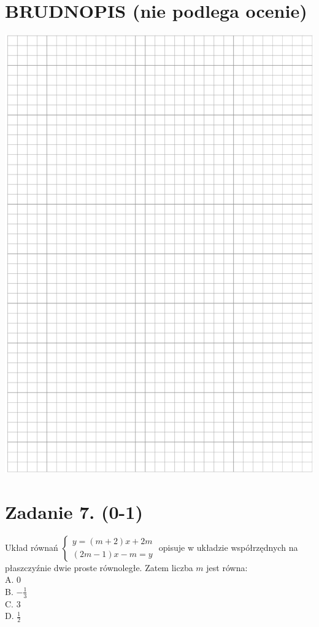 \documentclass[10pt]{article}
\begin{document}
\section*{BRUDNOPIS (nie podlega ocenie)}
\begin{center}
\includegraphics[max width=\textwidth]{2024_11_21_99eb8e6624b497a5af43g-03}
\end{center}

\section*{Zadanie 7. (0-1)}
Układ równań \(\left\{\begin{array}{l}y=(m+2) x+2 m \\ (2 m-1) x-m=y\end{array}\right.\) opisuje w układzie współrzędnych na płaszczyźnie dwie proste równoległe. Zatem liczba \(m\) jest równa:\\
A. 0\\
B. \(-\frac{1}{3}\)\\
C. 3\\
D. \(\frac{1}{2}\)
\end{document}
